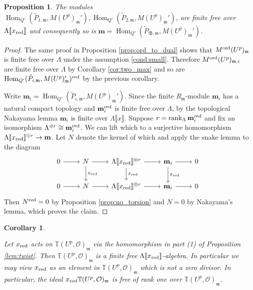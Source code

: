 \documentclass[leqno]{amsart}
\newtheorem{prop}[thm]{Proposition}
\newtheorem{cor}[thm]{Corollary}
\theoremstyle{definition}
\theoremstyle{remark}
\newcommand{\oo}{\mathcal{O}}
\DeclareMathOperator{\Hom}{Hom}
\DeclareMathOperator{\rank}{rank}
\newcommand{\fm}{\mathfrak{m}}
\newcommand{\B}{\mathfrak B} %
\newcommand{\red}{\textnormal{red}}
\newcommand{\xx}{x_\textnormal{red}}
\newcommand{\TT}{\mathbb{T}} %
\newcommand{\ord}{\textnormal{ord}} %
\begin{document}
\begin{prop}\label{prop:Hecke_finite}
The modules
$\Hom_{Q'}(\tilde{P}_{1,\fm},M(U^p)_{\fm}'),
\Hom_{Q'}(\tilde{P}_{2,\fm},M(U^p)_{\fm}')$,
are finite free over 
$\Lambda\llbracket \xx\rrbracket$
and consequently so is 
$\mathbf{m}=
\Hom_{Q'}(\tilde{P}_{\B,\fm},M(U^p)_{\fm}')$.
\end{prop}
\begin{proof}
    The same proof in Proposition \ref{prop:ord_to_dual}
    shows that $M^{\ord}(U^p)_\fm$ is finite free over $\Lambda$
    under the assumption \eqref{cond:small}.
    Therefore $M^{\ord}(U^p)_{\fm,i}$ are finite free over $\Lambda$
    by Corollary \ref{cor:two_max} and so are 
    $\Hom_{Q'}(\tilde{P}_{i,\fm},M(U^p)_{\fm}')^{\red}$
    by the previous corollary.

    Write $\mathbf{m}_i=\Hom_{Q'}(\tilde{P}_{i,\fm},M(U^p)_{\fm}')$.
    Since the finite $R_\fm$-module
    $\mathbf{m}_i$ has a natural compact topology
    and $\mathbf{m}_i^\red$ is finite free over $\Lambda$,
	by the topological Nakayama lemma
	$\mathbf{m}_i$ is finite over $\Lambda\llbracket x\rrbracket$.
    Suppose $r=\rank_{\Lambda}\mathbf{m}_i^\red$
    and fix an isomorphism $\Lambda^{\oplus r}\cong \mathbf{m}_i^\red$.
    We can lift which to a surjective homomorphism
    $\Lambda\llbracket \xx\rrbracket^{\oplus r}\to\mathbf{m}$.
    Let $N$ denote the kernel of which and 
    apply the snake lemma to the diagram
    \[
    \begin{tikzcd}
    0\arrow[r]& 
    N\arrow[r]\arrow[d,"\xx"]&
    \Lambda\llbracket \xx\rrbracket^{\oplus r}\arrow[r]\arrow[d,"\xx"]&
    \mathbf{m}_i\arrow[r]\arrow[d,"\xx"] &0\\
    0\arrow[r]& 
    N\arrow[r]&
    \Lambda\llbracket \xx\rrbracket^{\oplus r}\arrow[r]&
    \mathbf{m}_i\arrow[r] &0
    \end{tikzcd}
    \]
    Then $N^\red=0$ by Proposition \ref{prop:no_torsion}
    and $N=0$ by Nakayama's lemma, which proves the claim.
\end{proof}



\begin{cor}\label{cor:Hecke_ff}

Let $\xx$ acts on $\TT(U^p,\oo)_\fm$ via 
the homomorphism in part (1) of Proposition \ref{lem:twist}.
Then $\TT(U^p,\oo)_\fm$ is a finite free 
$\Lambda\llbracket\xx\rrbracket$-algebra.
In particular we may view $\xx$ as an element in 
$\TT(U^p,\oo)_\fm$
which is not a zero divisor.
In particular, the ideal $\xx\TT(U^p,\oo)_\fm$
is free of rank one over $\TT(U^p,\oo)_\fm$.

\end{cor}
\end{document}
